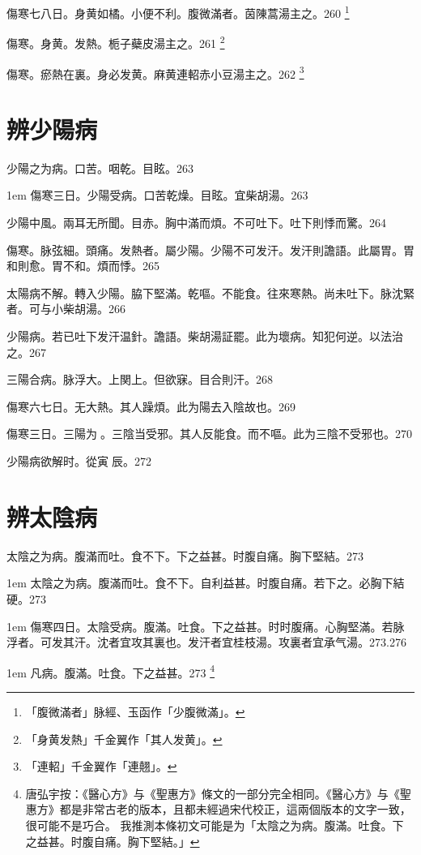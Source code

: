 傷寒七八日。身黄如橘。小便不利。腹微滿者。茵陳{\khaaitp 蒿}湯主之。260
	\footnote{「腹微滿者」脉經、玉函作「少腹微滿」。}

傷寒。身黄。发熱。栀子蘗皮湯主之。261
	\footnote{「身黄发熱」千金翼作「其人发黄」。}

傷寒。瘀熱在裏。身必发黄。麻黄連軺赤小豆湯主之。262
	\footnote{「連軺」千金翼作「連翹」。}

\chapter{辨少陽病}

少陽之为病。口苦。咽乾。目眩。263

\hangindent 1em
傷寒三日。少陽受病。口苦乾燥。目眩。宜柴胡湯。{\gaoben}263

少陽中風。兩耳无所聞。目赤。胸中滿而煩。不可吐下。吐下則悸而驚。264

傷寒。脉弦細。頭痛。发熱者。屬少陽。少陽不可发汗。发汗則譫語。此屬胃。胃和則愈。胃不和。煩而悸。265

太陽病不解。轉入少陽。脇下堅滿。乾嘔。不能食。往來寒熱。尚未吐下。脉沈緊者。可与小柴胡湯。266

{\khaaitp 少陽病。}若已吐下发汗温針。{\khaaitp 譫語。}柴胡湯証罷。此为壞病。知犯何逆。以法治之。267

三陽合病。脉浮大。上関上。但欲寐。目合則汗。268

傷寒六七日。无大熱。其人躁煩。此为陽去入陰故也。269

傷寒三日。三陽为{\sungtpii 𥁞}。三陰当受邪。其人反能食。而不嘔。此为三陰不受邪也。270

少陽病欲解时。從寅{\sungtpii 𥁞}辰。272

\chapter{辨太陰病}

太陰之为病。腹滿而吐。食不下。下之益甚。时腹自痛。胸下堅結。273

\hangindent 1em
太陰之为病。腹滿而吐。食不下。自利益甚。时腹自痛。若下之。必胸下結硬。{\zhaoben}273

\hangindent 1em
傷寒四日。太陰受病。腹滿。吐食。下之益甚。时时腹痛。心胸堅滿。若脉浮者。可发其汗。沈者宜攻其裏也。发汗者宜桂枝湯。攻裏者宜承气湯。{\gaoben}273.276

\hangindent 1em
凡病。腹滿。吐食。下之益甚。{\yixin}273
	\footnote{
		唐弘宇按：《醫心方》与《聖惠方》條文的一部分完全相同。《醫心方》与《聖惠方》都是非常古老的版本，且都未經過宋代校正，這兩個版本的文字一致，很可能不是巧合。
		我推測本條初文可能是为「太陰之为病。腹滿。吐食。下之益甚。时腹自痛。胸下堅結。」
	}

